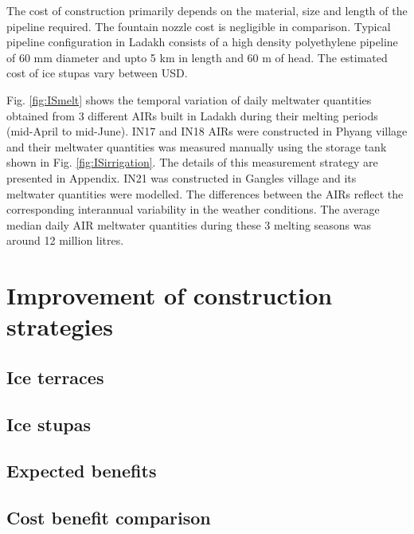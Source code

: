 The cost of construction primarily depends on the material, size and length of the pipeline required. The
fountain nozzle cost is negligible in comparison. Typical pipeline configuration in Ladakh consists of a high
density polyethylene pipeline of 60 mm diameter and upto 5 km in length and 60 m of head. The estimated cost
of ice stupas vary between USD.

Fig. \ref{fig:ISmelt} shows the temporal variation of daily meltwater quantities obtained from 3 different AIRs
built in Ladakh during their melting periods (mid-April to mid-June). IN17 and IN18 AIRs were constructed in
Phyang village and their meltwater quantities was measured manually using the storage tank shown in Fig.
\ref{fig:ISirrigation}. The details of this measurement strategy are presented in Appendix. IN21 was constructed
in Gangles village and its meltwater quantities were modelled. The differences between the AIRs reflect the
corresponding interannual variability in the weather conditions. The average median daily AIR meltwater
quantities during these 3 melting seasons was around 12 million litres.    

\section{Improvement of construction strategies}

\subsection{Ice terraces}

\subsection{Ice stupas}

\subsection{Expected benefits}

\subsection{Cost benefit comparison}





